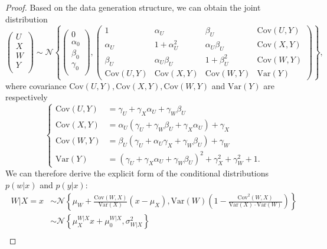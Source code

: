 \documentclass[
  12pt]{article}
\def\cN{\mathcal{N}}
\begin{document}
\begin{proof}
Based on the data generation structure, we can obtain the joint distribution
$$
\left( \begin{array}{c}
	U\\
	X\\
	W\\
	Y\\
\end{array} \right) \sim \cN\left\{ \left( \begin{array}{c}
	0\\
	\alpha_0\\
	\beta_0\\
	\gamma_0\\
\end{array} \right) ,\left( \begin{matrix}
	1&		\alpha_U&		\beta_{U}&		\mathrm{Cov}(U,Y)\\
	\alpha_U&		1+\alpha_U^{2}&		\alpha_U\beta_{U}&		\mathrm{Cov}(X,Y)\\
	\beta_{U}&		\alpha_U\beta_{U}&		1+\beta_{U}^{2}&		\mathrm{Cov}(W,Y)\\
	\mathrm{Cov}(U,Y)&		\mathrm{Cov}(X,Y)&		\mathrm{Cov}(W,Y)&		\mathrm{Var}(Y)
\end{matrix} \right) \right\},
$$
where covariance $\mathrm{Cov}(U,Y),\mathrm{Cov}(X,Y),\mathrm{Cov}(W,Y)$ and $\mathrm{Var}(Y)$ are respectively
$$
\left\{ \begin{aligned}
	\mathrm{Cov}(U,Y)&=\gamma_{U}+\gamma_X\alpha_U+\gamma_W\beta_{U}\\
	\mathrm{Cov}(X,Y)&=\alpha_U\left( \gamma_{U}+\gamma_W\beta_{U}+\gamma_X\alpha_U \right) +\gamma_X\\
	\mathrm{Cov}(W,Y)&=\beta_{U}\left( \gamma_{U}+\alpha_U\gamma_X+\gamma_W\beta_{U} \right) +\gamma_W\\
	\mathrm{Var}(Y)&=(\gamma_{U}+\gamma_X\alpha_U+\gamma_W\beta_{U})^2+\gamma_X^{2}+\gamma_W^{2}+1.
\end{aligned} \right.
$$
We can therefore derive the explicit form of the conditional distributions $p(w|x)$ and $p(y|x)$:
$$
\begin{aligned}
	W|X=x&\sim \cN\left\{ \mu_W+\frac{\mathrm{Cov}(W,X)}{\mathrm{Var}(X)}(x-\mu_{X}),\mathrm{Var}(W)\left( 1-\frac{\mathrm{Cov}^2(W,X)}{\mathrm{Var}(X)\cdot \mathrm{Var}(W)} \right) \right\}\\
	&\sim \cN\left\{ \mu_{X}^{W|X}x+\mu_{0}^{W|X},\sigma_{W|X}^{2} \right\} 
\end{aligned}
$$
$$
\begin{aligned}

\end{aligned}$$
\end{proof}
\end{document}
